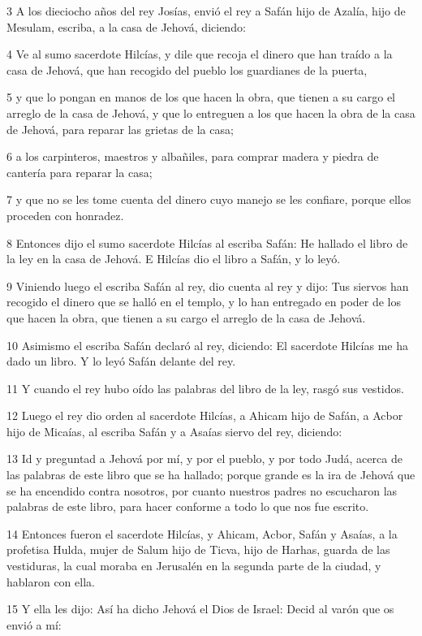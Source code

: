 \par 3 A los dieciocho años del rey Josías, envió el rey a Safán hijo de Azalía, hijo de Mesulam, escriba, a la casa de Jehová, diciendo:
\par 4 Ve al sumo sacerdote Hilcías, y dile que recoja el dinero que han traído a la casa de Jehová, que han recogido del pueblo los guardianes de la puerta,
\par 5 y que lo pongan en manos de los que hacen la obra, que tienen a su cargo el arreglo de la casa de Jehová, y que lo entreguen a los que hacen la obra de la casa de Jehová, para reparar las grietas de la casa;
\par 6 a los carpinteros, maestros y albañiles, para comprar madera y piedra de cantería para reparar la casa;
\par 7 y que no se les tome cuenta del dinero cuyo manejo se les confiare, porque ellos proceden con honradez.
\par 8 Entonces dijo el sumo sacerdote Hilcías al escriba Safán: He hallado el libro de la ley en la casa de Jehová. E Hilcías dio el libro a Safán, y lo leyó.
\par 9 Viniendo luego el escriba Safán al rey, dio cuenta al rey y dijo: Tus siervos han recogido el dinero que se halló en el templo, y lo han entregado en poder de los que hacen la obra, que tienen a su cargo el arreglo de la casa de Jehová.
\par 10 Asimismo el escriba Safán declaró al rey, diciendo: El sacerdote Hilcías me ha dado un libro. Y lo leyó Safán delante del rey.
\par 11 Y cuando el rey hubo oído las palabras del libro de la ley, rasgó sus vestidos.
\par 12 Luego el rey dio orden al sacerdote Hilcías, a Ahicam hijo de Safán, a Acbor hijo de Micaías, al escriba Safán y a Asaías siervo del rey, diciendo:
\par 13 Id y preguntad a Jehová por mí, y por el pueblo, y por todo Judá, acerca de las palabras de este libro que se ha hallado; porque grande es la ira de Jehová que se ha encendido contra nosotros, por cuanto nuestros padres no escucharon las palabras de este libro, para hacer conforme a todo lo que nos fue escrito.
\par 14 Entonces fueron el sacerdote Hilcías, y Ahicam, Acbor, Safán y Asaías, a la profetisa Hulda, mujer de Salum hijo de Ticva, hijo de Harhas, guarda de las vestiduras, la cual moraba en Jerusalén en la segunda parte de la ciudad, y hablaron con ella.
\par 15 Y ella les dijo: Así ha dicho Jehová el Dios de Israel: Decid al varón que os envió a mí:
